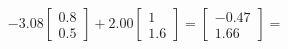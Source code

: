 \documentclass[preview]{standalone}
\begin{document}
\begin{align*}
-3.08 \begin{bmatrix} 0.8 \\ 0.5 \end{bmatrix} + 2.00 \begin{bmatrix} 1 \\ 1.6 \end{bmatrix} = \begin{bmatrix} -0.47 \\ 1.66 \end{bmatrix} =
\end{align*}
\end{document}
